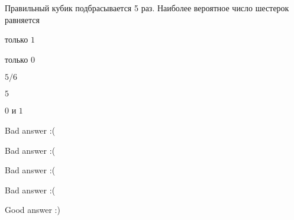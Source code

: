 
\begin{question}
Правильный кубик подбрасывается 5 раз. Наиболее вероятное число шестерок
равняется
\begin{answerlist}
  \item только \(1\)
  \item только \(0\)
  \item \(5/6\)
  \item \(5\)
  \item \(0\) и \(1\)
\end{answerlist}
\end{question}

\begin{solution}
\begin{answerlist}
  \item Bad answer :(
  \item Bad answer :(
  \item Bad answer :(
  \item Bad answer :(
  \item Good answer :)
\end{answerlist}
\end{solution}

